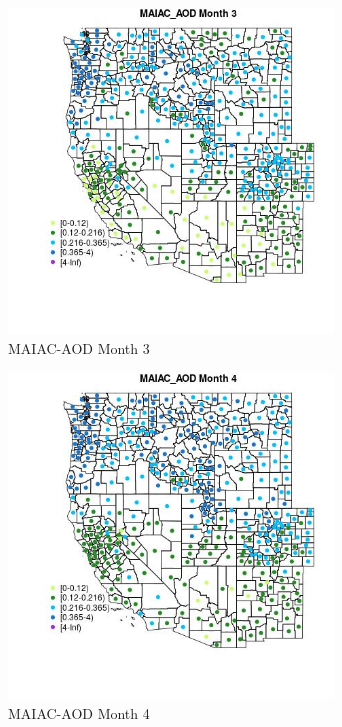 \begin{figure} 
\centering  
\includegraphics[width=0.77\textwidth]{Code_Outputs/df_report_ML_predictors_CountyCentroid_Locations_Dates_2008-01-01to2018-12-31_MapObsMo3MAIAC_AOD.jpg} 
\caption{\label{fig:df_report_ML_predictors_CountyCentroid_Locations_Dates_2008-01-01to2018-12-31MapObsMo3MAIAC_AOD}MAIAC-AOD Month 3} 
\end{figure} 
 

\begin{figure} 
\centering  
\includegraphics[width=0.77\textwidth]{Code_Outputs/df_report_ML_predictors_CountyCentroid_Locations_Dates_2008-01-01to2018-12-31_MapObsMo4MAIAC_AOD.jpg} 
\caption{\label{fig:df_report_ML_predictors_CountyCentroid_Locations_Dates_2008-01-01to2018-12-31MapObsMo4MAIAC_AOD}MAIAC-AOD Month 4} 
\end{figure} 
 

